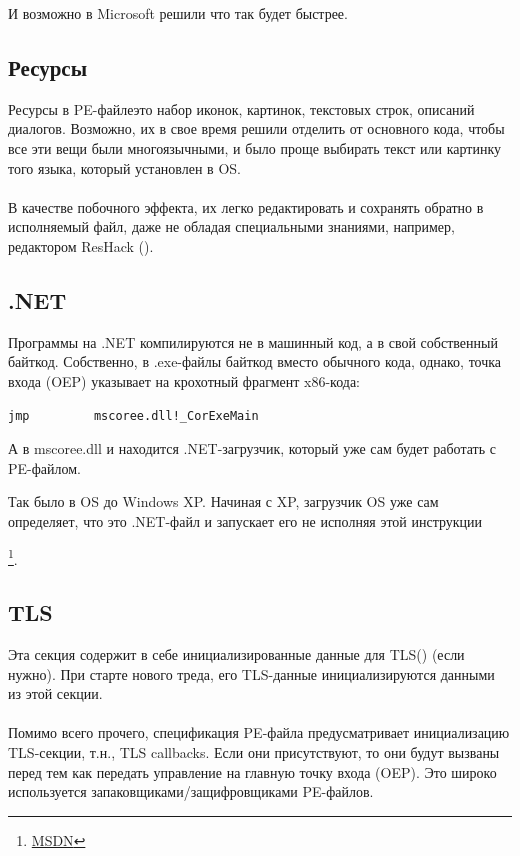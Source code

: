 И возможно в Microsoft решили что так будет быстрее.

\subsection{Ресурсы}

\label{PEresources}
Ресурсы в PE-файле\EMDASH{}это набор иконок, картинок, текстовых строк, описаний диалогов.
Возможно, их в свое время решили отделить от основного кода, чтобы все эти вещи были многоязычными,
и было проще выбирать текст или картинку того языка, который установлен в \ac{OS}. \\
\\
В качестве побочного эффекта, их легко редактировать и сохранять обратно в исполняемый файл,
даже не обладая специальными знаниями, например, редактором ResHack ().

\subsection{.NET}

Программы на .NET компилируются не в машинный код, а в свой собственный байткод.
Собственно, в .exe-файлы байткод вместо обычного кода, однако, точка входа (\ac{OEP}) 
указывает на крохотный фрагмент x86-кода:

\begin{lstlisting}
jmp         mscoree.dll!_CorExeMain
\end{lstlisting}

А в mscoree.dll и находится .NET-загрузчик, который уже сам будет работать с PE-файлом.

Так было в \ac{OS} до Windows XP. Начиная с XP, загрузчик \ac{OS} уже сам определяет, что это
.NET-файл и запускает его не исполняя этой инструкции \JMP

\footnote{\href{http://go.yurichev.com/17051}{MSDN}}.

\subsection{TLS}

Эта секция содержит в себе инициализированные данные для \ac{TLS}() (если нужно).
При старте нового треда, его \ac{TLS}-данные инициализируются данными из этой секции. \\
\\
Помимо всего прочего, спецификация PE-файла предусматривает инициализацию \ac{TLS}-секции, т.н., TLS callbacks.
Если они присутствуют, то они будут вызваны перед тем как передать управление на главную точку входа (\ac{OEP}).
Это широко используется запаковщиками/защифровщиками PE-файлов.

